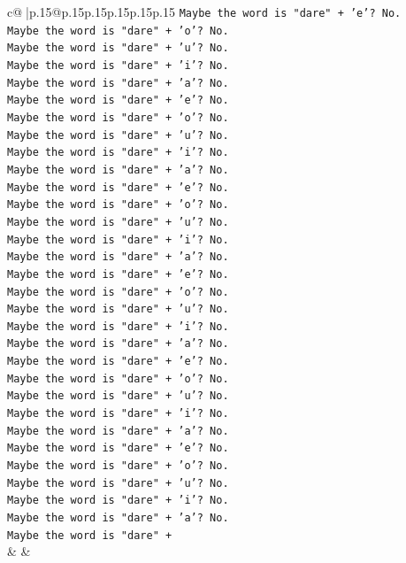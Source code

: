 \documentclass{article}
\begin{document}
{\begin{supertabular}{c@{$\;$}|p{.15\linewidth}@{}p{.15\linewidth}p{.15\linewidth}p{.15\linewidth}p{.15\linewidth}p{.15\linewidth}}
{{{\texttt{Maybe the word is "dare" + 'e'? No.} \\
\texttt{Maybe the word is "dare" + 'o'? No.} \\
\texttt{Maybe the word is "dare" + 'u'? No.} \\
\texttt{Maybe the word is "dare" + 'i'? No.} \\
\texttt{Maybe the word is "dare" + 'a'? No.} \\
\texttt{Maybe the word is "dare" + 'e'? No.} \\
\texttt{Maybe the word is "dare" + 'o'? No.} \\
\texttt{Maybe the word is "dare" + 'u'? No.} \\
\texttt{Maybe the word is "dare" + 'i'? No.} \\
\texttt{Maybe the word is "dare" + 'a'? No.} \\
\texttt{Maybe the word is "dare" + 'e'? No.} \\
\texttt{Maybe the word is "dare" + 'o'? No.} \\
\texttt{Maybe the word is "dare" + 'u'? No.} \\
\texttt{Maybe the word is "dare" + 'i'? No.} \\
\texttt{Maybe the word is "dare" + 'a'? No.} \\
\texttt{Maybe the word is "dare" + 'e'? No.} \\
\texttt{Maybe the word is "dare" + 'o'? No.} \\
\texttt{Maybe the word is "dare" + 'u'? No.} \\
\texttt{Maybe the word is "dare" + 'i'? No.} \\
\texttt{Maybe the word is "dare" + 'a'? No.} \\
\texttt{Maybe the word is "dare" + 'e'? No.} \\
\texttt{Maybe the word is "dare" + 'o'? No.} \\
\texttt{Maybe the word is "dare" + 'u'? No.} \\
\texttt{Maybe the word is "dare" + 'i'? No.} \\
\texttt{Maybe the word is "dare" + 'a'? No.} \\
\texttt{Maybe the word is "dare" + 'e'? No.} \\
\texttt{Maybe the word is "dare" + 'o'? No.} \\
\texttt{Maybe the word is "dare" + 'u'? No.} \\
\texttt{Maybe the word is "dare" + 'i'? No.} \\
\texttt{Maybe the word is "dare" + 'a'? No.} \\
\texttt{Maybe the word is "dare" +} \\
            }
        }
    }
    & & \\ \\


\end{supertabular}}
\end{document}
